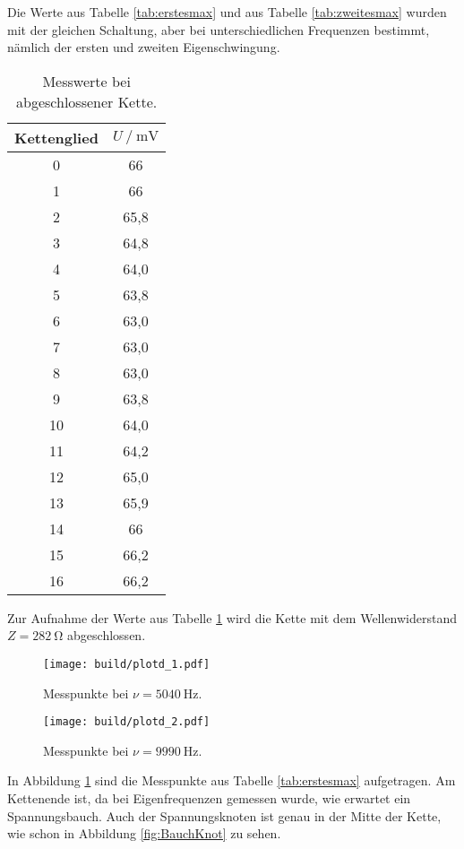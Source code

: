 Die Werte aus Tabelle \ref{tab:erstesmax} und aus Tabelle \ref{tab:zweitesmax}
wurden mit der gleichen Schaltung, aber bei unterschiedlichen Frequenzen bestimmt,
nämlich der ersten und zweiten Eigenschwingung.


\begin{table}[h]
  \centering
  \caption{Messwerte bei abgeschlossener Kette.}
  \label{tab:absw=wellw}
  \begin{tabular}{c c}
    \toprule
     Kettenglied & $U \:/\: \si{\milli\volt}$\\
    \midrule
    0 & 66\\
    1 & 66\\
    2 & 65,8\\
    3 & 64,8\\
    4 & 64,0\\
    5 & 63,8\\
    6 & 63,0\\
    7 & 63,0\\
    8 & 63,0\\
    9 & 63,8\\
    10 & 64,0\\
    11 & 64,2\\
    12 & 65,0\\
    13 & 65,9\\
    14 & 66\\
    15 & 66,2\\
    16 & 66,2\\
    \bottomrule
  \end{tabular}
\end{table}

Zur Aufnahme der Werte aus Tabelle \ref{tab:absw=wellw} wird die Kette mit dem
Wellenwiderstand $Z = \SI{282}{\ohm}$ abgeschlossen.

\begin{figure}[h]
  \centering
  \texttt{[image: build/plotd\_1.pdf]}
  \caption{Messpunkte bei $\nu = \SI{5040}{\hertz}$.}
  \label{fig:erstesmax}
\end{figure}

\begin{figure}[h]
  \centering
  \texttt{[image: build/plotd\_2.pdf]}
  \caption{Messpunkte bei $\nu = \SI{9990}{\hertz}$.}
  \label{fig:zweitesmax}
\end{figure}

In Abbildung \ref{fig:erstesmax} sind die Messpunkte aus Tabelle \ref{tab:erstesmax}
aufgetragen. Am Kettenende ist, da bei Eigenfrequenzen gemessen  wurde,
 wie erwartet ein Spannungsbauch. Auch der Spannungsknoten ist genau in der Mitte der Kette, wie schon
 in  Abbildung \ref{fig:BauchKnot} zu sehen.

